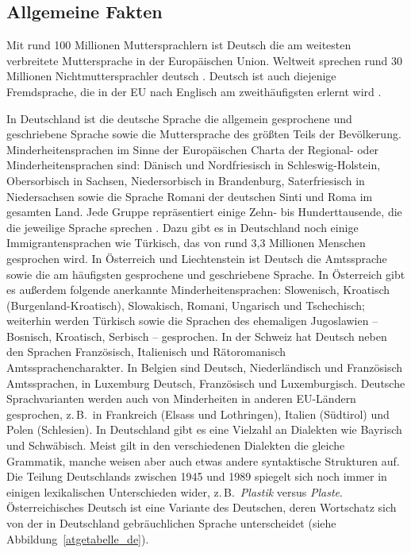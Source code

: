 \documentclass[]{../../metanetpaper}
\begin{document}
\begin{multicols}{2}

\subsection{Allgemeine Fakten}

Mit rund 100 Millionen Muttersprachlern ist Deutsch die am weitesten verbreitete Muttersprache in der Europäischen Union. Weltweit sprechen rund 30 Millionen Nichtmuttersprachler deutsch \cite{Eur1}. Deutsch ist auch diejenige Fremdsprache, die in der EU nach Englisch am zweithäufigsten erlernt wird \cite{Goe1}.


In Deutschland ist die deutsche Sprache die allgemein gesprochene und geschriebene Sprache sowie die Muttersprache des größten Teils der Bevölkerung. Minderheitensprachen im Sinne der Europäischen Charta der Regional- oder Minderheitensprachen sind: Dänisch und Nordfriesisch in Schles\-wig-Hol\-stein, Obersorbisch in Sachsen, Niedersorbisch in Brandenburg, Saterfriesisch in Niedersachsen sowie die Sprache Romani der deutschen Sinti und Roma im gesamten Land. Jede Gruppe repräsentiert einige Zehn- bis Hunderttausende, die die jeweilige Sprache sprechen \cite{Efni1}. Dazu gibt es in Deutschland noch einige Immigrantensprachen wie Türkisch, das von rund 3,3 Millionen Menschen gesprochen wird. In Österreich und Liechtenstein ist Deutsch die Amtssprache sowie die am häufigsten gesprochene und geschriebene Sprache. In Österreich gibt es außerdem folgende anerkannte Minderheitensprachen: Slowenisch, Kroatisch (Bur\-gen\-land-Kro\-atisch), Slowakisch, Romani, Ungarisch und Tschechisch; weiterhin werden Türkisch sowie die Sprachen des ehemaligen Jugoslawien -- Bosnisch, Kroatisch, Serbisch -- gesprochen.  In der Schweiz hat Deutsch neben den Sprachen Französisch, Italienisch und Rätoromanisch Amtssprachencharakter. In Belgien sind Deutsch, Niederländisch und Französisch Amtssprachen, in Luxemburg Deutsch, Französisch und Luxemburgisch. Deutsche Sprachvarianten werden auch von Minderheiten in anderen EU-Län\-dern gesprochen, z.\,B.~in Frankreich (Elsass und Lothringen), Italien (Südtirol) und Polen (Schlesien).  In Deutschland gibt es eine Vielzahl an Dialekten wie Bayrisch und Schwäbisch. Meist gilt in den verschiedenen Dialekten die gleiche Grammatik, manche weisen aber auch etwas andere syntaktische Strukturen auf. Die Teilung Deutschlands zwischen 1945 und 1989 spiegelt sich noch immer in einigen lexikalischen Unterschieden wider, z.\,B.~\textit{Plastik} versus \textit{Plaste}. Österreichisches Deutsch ist eine Variante des Deutschen, deren Wortschatz sich von der in Deutschland gebräuchlichen Sprache unterscheidet (siehe Abbildung~\ref{atgetabelle_de}).

\end{multicols}
\end{document}
